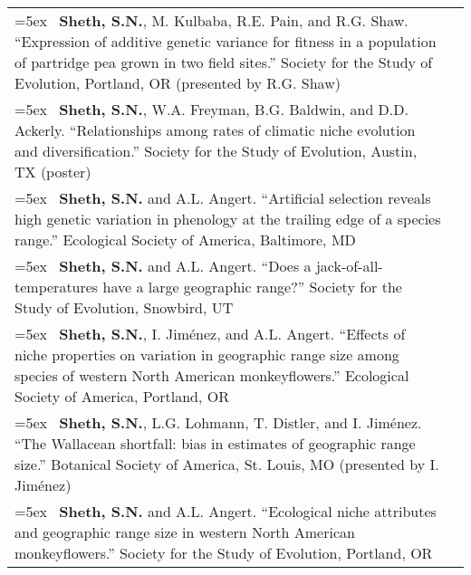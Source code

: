 \documentclass[11pt,english]{article}\usepackage[]{graphicx}\usepackage[]{xcolor}
\providecommand{\tabularnewline}{\\}
\begin{document}
\begin{tabularx}{\textwidth}{@{}>{\raggedright}p{5.25in} >{\raggedleft}X@{}}
\hangindent=5ex \ \textbf{Sheth, S.N.}, M. Kulbaba, R.E. Pain, and R.G. Shaw. ``Expression of additive genetic variance for fitness in a population of partridge pea grown in two field sites.'' Society for the Study of Evolution, Portland, OR (presented by R.G. Shaw) & 2017 \tabularnewline

\hangindent=5ex \ \textbf{Sheth, S.N.}, W.A. Freyman, B.G. Baldwin, and D.D. Ackerly. ``Relationships among rates of climatic niche evolution and diversification.'' Society for the Study of Evolution, Austin, TX (poster) & 2016 \tabularnewline


\hangindent=5ex \ \textbf{Sheth, S.N.} and A.L. Angert. ``Artificial selection reveals high genetic variation in phenology at the trailing edge of a species range.'' Ecological Society of America, Baltimore, MD & 2015 \tabularnewline

\hangindent=5ex \ \textbf{Sheth, S.N.} and A.L. Angert. ``Does a jack-of-all-temperatures have a large geographic range?'' Society for the Study of Evolution, Snowbird, UT & 2013 \tabularnewline



\hangindent=5ex \ \textbf{Sheth, S.N.}, I. Jim\'enez, and A.L. Angert. ``Effects of niche properties on variation in geographic range size among species of western North American monkeyflowers.'' Ecological Society of America, Portland, OR & 2012 \tabularnewline

\hangindent=5ex \ \textbf{Sheth, S.N.}, L.G. Lohmann, T. Distler, and I. Jim\'enez. ``The Wallacean shortfall: bias in estimates of geographic range size.'' Botanical Society of America, St. Louis, MO (presented by I. Jim\'enez) & 2011 \tabularnewline

\hangindent=5ex \ \textbf{Sheth, S.N.} and A.L. Angert. ``Ecological niche attributes and geographic range size in western North American monkeyflowers.'' Society for the Study of Evolution, Portland, OR & 2010 \tabularnewline

\end{tabularx}
\end{document}
